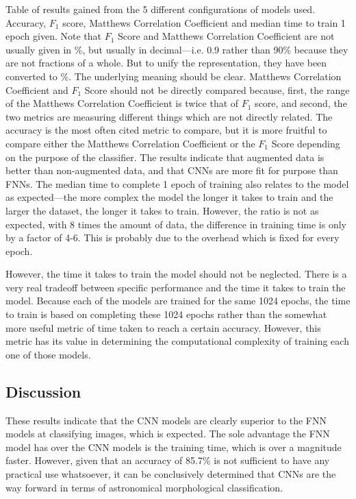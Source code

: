 \documentclass[a4paper,fleqn,usenatbib]{mnras}
\begin{document}
\begin{table}
\caption{Table of results gained from the 5 different configurations of models used. Accuracy, $F_	1$ score, Matthews Correlation Coefficient and median time to train 1 epoch given. Note that $F_1$ Score and Matthews Correlation Coefficient are not usually given in \%, but usually in decimal---i.e. 0.9 rather than 90\% because they are not fractions of a whole. But to unify the representation, they have been converted to \%. The underlying meaning should be clear. Matthews Correlation Coefficient and $F_1$ Score should not be directly compared because, first, the range of the Matthews Correlation Coefficient is twice that of $F_1$ score, and second, the two metrics are measuring different things which are not directly related. The accuracy is the most often cited metric to compare, but it is more fruitful to compare either the Matthews Correlation Coefficient or the $F_1$ Score depending on the purpose of the classifier. The results indicate that augmented data is better than non-augmented data, and that CNNs are more fit for purpose than FNNs. The median time to complete 1 epoch of training also relates to the model as expected---the more complex the model the longer it takes to train and the larger the dataset, the longer it takes to train. However, the ratio is not as expected, with 8 times the amount of data, the difference in training time is only by a factor of 4-6. This is probably due to the overhead which is fixed for every epoch. \label{table:results}}
\end{table}
However, the time it takes to train the model should not be neglected. There is a very real tradeoff between specific performance and the time it takes to train the model. Because each of the models are trained for the same 1024 epochs, the time to train is based on completing these 1024 epochs rather than the somewhat more useful metric of time taken to reach a certain accuracy. However, this metric has its value in determining the computational complexity of training each one of those models. 
\subsection{Discussion}
These results indicate that the CNN models are clearly superior to the FNN models at classifying images, which is expected. The sole advantage the FNN model has over the CNN models is the training time, which is over a magnitude faster. However, given that an accuracy of 85.7\% is not sufficient to have any practical use whatsoever, it can be conclusively determined that CNNs are the way forward in terms of astronomical morphological classification. 
\end{document}
